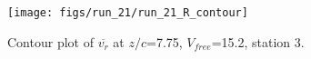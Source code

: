 \begin{figure}[H]
\centering
\texttt{[image: figs/run\_21/run\_21\_R\_contour]}
\caption{Contour plot of $\overline{v_{r}}$ at $z/c$=7.75, $V_{free}$=15.2, station 3.}
\label{fig:run_21_R_contour}
\end{figure}


